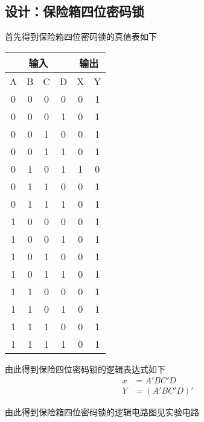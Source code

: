 \documentclass{article}
\begin{document}
\subsection{设计：保险箱四位密码锁}
首先得到保险箱四位密码锁的真值表如下
\begin{table}[h]
 \centering  
 \begin{tabular}{c|c|c|c|c|c}
     \hline
     \multicolumn{4}{c}{输入} \vline  &  \multicolumn{2}{c}{输出} \vline     \\ \hline
           A             & B    &C   &D   &   X               & Y            \\ \hline
           0             & 0    &0   &0   &   0               & 1            \\ \hline
           0             & 0    &0   &1   &   0               & 1            \\ \hline
           0             & 0    &1   &0   &   0               & 1            \\ \hline
           0             & 0    &1   &1   &   0               & 1            \\ \hline
           0             & 1    &0   &1   &   1               & 0            \\ \hline
           0             & 1    &1   &0   &   0               & 1            \\ \hline
           0             & 1    &1   &1   &   0               & 1            \\ \hline
           1             & 0    &0   &0   &   0               & 1            \\ \hline
           1             & 0    &0   &1   &   0               & 1            \\ \hline
           1             & 0    &1   &0   &   0               & 1            \\ \hline
           1             & 0    &1   &1   &   0               & 1            \\ \hline
           1             & 1    &0   &0   &   0               & 1            \\ \hline
           1             & 1    &0   &1   &   0               & 1            \\ \hline
           1             & 1    &1   &0   &   0               & 1            \\ \hline
           1             & 1    &1   &1   &   0               & 1            \\ \hline
         \end{tabular}
\end{table}
\par
由此得到保险四位密码锁的逻辑表达式如下
\begin{align*}
\ x&=A'BC'D\\
\ Y&=(A'BC'D)'
\end{align*}
\par
由此得到保险箱四位密码锁的逻辑电路图见实验电路
\end{document}
